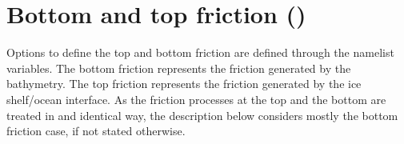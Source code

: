 \documentclass[../main/NEMO_manual]{subfiles}
\begin{document}
\section[Bottom and top friction (\textit{zdfdrg.F90})]{Bottom and top friction (\protect{})}
\label{sec:ZDF_drg}

\begin{listing}
  \caption{}
  \label{lst:namdrg}
\end{listing}
\begin{listing}
  \caption{}
  \label{lst:namdrg_top}
\end{listing}
\begin{listing}
  \caption{}
  \label{lst:namdrg_bot}
\end{listing}

Options to define the top and bottom friction are defined through the  namelist variables.
The bottom friction represents the friction generated by the bathymetry.
The top friction represents the friction generated by the ice shelf/ocean interface.
As the friction processes at the top and the bottom are treated in and identical way,
the description below considers mostly the bottom friction case, if not stated otherwise.
\end{document}
